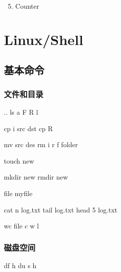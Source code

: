 \documentclass[letterpaper,10pt,english]{sphinxmanual}
\begin{document}
\begin{quote}

\end{quote}
\begin{enumerate}
\setcounter{enumi}{4}
\item {} 
Counter

\end{enumerate}
\begin{quote}

\end{quote}


\chapter{Linux/Shell}
\label{\detokenize{linux/index:linux-shell}}\label{\detokenize{linux/index::doc}}

\section{基本命令}
\label{\detokenize{linux/01_basic::doc}}\label{\detokenize{linux/01_basic:id1}}

\subsection{文件和目录}
\label{\detokenize{linux/01_basic:id2}}
%
\begin{sphinxVerbatim}[commandchars=\\\{\}]
 ..
ls \PYGZhy{}a \PYGZhy{}F \PYGZhy{}R \PYGZhy{}l

cp \PYG{o}{[}\PYGZhy{}i\PYG{o}{]} src dst
cp \PYGZhy{}R

mv src des
rm \PYGZhy{}i \PYGZhy{}r \PYGZhy{}f folder

touch new 

mkdir new
rmdir new

file my\PYGZus{}file 

cat \PYGZhy{}n log.txt
tail log.txt
head \PYGZhy{}5 log.txt

wc file \PYGZhy{}c \PYGZhy{}w \PYGZhy{}l
\end{sphinxVerbatim}


\subsection{磁盘空间}
\label{\detokenize{linux/01_basic:id3}}
%
\begin{sphinxVerbatim}[commandchars=\\\{\}]
df \PYGZhy{}h
du \PYG{o}{[}\PYGZhy{}s\PYG{o}{]} \PYGZhy{}h
\end{sphinxVerbatim}
\end{document}
